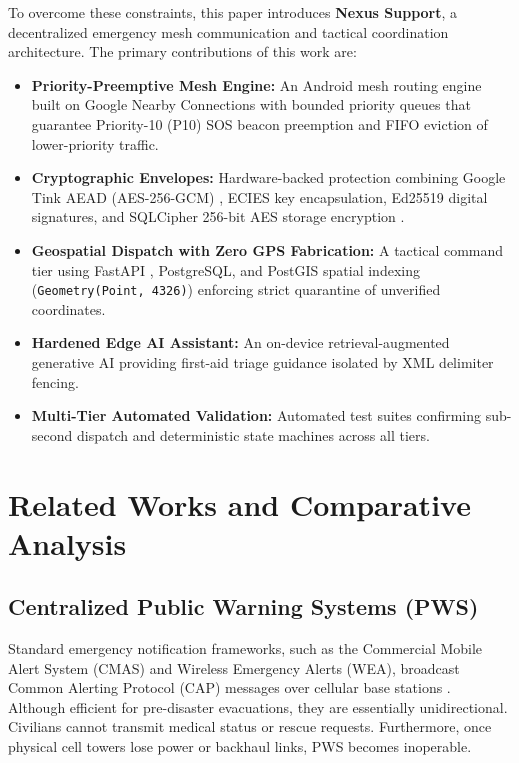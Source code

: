 \documentclass[conference,a4paper]{IEEEtran}
\begin{document}
To overcome these constraints, this paper introduces \textbf{Nexus Support}, a decentralized emergency mesh communication and tactical coordination architecture. The primary contributions of this work are:
\begin{itemize}
    \setlength{\itemsep}{1.5pt}
    \setlength{\parskip}{0pt}
    \item \textbf{Priority-Preemptive Mesh Engine:} An Android mesh routing engine built on Google Nearby Connections \cite{4} with bounded priority queues that guarantee Priority-10 (P10) SOS beacon preemption and FIFO eviction of lower-priority traffic.
    \item \textbf{Cryptographic Envelopes:} Hardware-backed protection combining Google Tink AEAD (AES-256-GCM) \cite{5}, ECIES key encapsulation, Ed25519 digital signatures, and SQLCipher 256-bit AES storage encryption \cite{6}.
    \item \textbf{Geospatial Dispatch with Zero GPS Fabrication:} A tactical command tier using FastAPI \cite{7}, PostgreSQL, and PostGIS spatial indexing \cite{8} (\texttt{Geometry(Point, 4326)}) enforcing strict quarantine of unverified coordinates.
    \item \textbf{Hardened Edge AI Assistant:} An on-device retrieval-augmented generative AI providing first-aid triage guidance isolated by XML delimiter fencing.
    \item \textbf{Multi-Tier Automated Validation:} Automated test suites confirming sub-second dispatch and deterministic state machines across all tiers.
\end{itemize}

\section{Related Works and Comparative Analysis}
\subsection{Centralized Public Warning Systems (PWS)}
Standard emergency notification frameworks, such as the Commercial Mobile Alert System (CMAS) and Wireless Emergency Alerts (WEA), broadcast Common Alerting Protocol (CAP) messages over cellular base stations \cite{16}. Although efficient for pre-disaster evacuations, they are essentially unidirectional. Civilians cannot transmit medical status or rescue requests. Furthermore, once physical cell towers lose power or backhaul links, PWS becomes inoperable.
\end{document}
